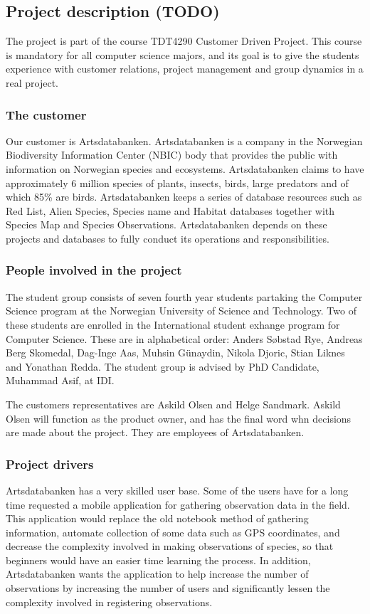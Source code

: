 \subsection{Project description (TODO)}
The project is part of the course TDT4290 Customer Driven Project. This course is mandatory for all computer science majors, and its goal is to give the students experience with customer relations, project management and group dynamics in a real project.

\subsubsection{The customer}
Our customer is Artsdatabanken. Artsdatabanken is a company in the Norwegian Biodiversity Information Center (NBIC) body that provides the public with information on Norwegian species and ecosystems. Artsdatabanken claims to have approximately 6 million species of plants, insects, birds, large predators and of which 85\% are birds. Artsdatabanken keeps a series of database resources such as Red List, Alien Species, Species name and Habitat databases together with Species Map and Species Observations. Artsdatabanken depends on these projects and databases to fully conduct its operations and responsibilities.\cite{artsdatabanken:about} 

\subsubsection{People involved in the project}
The student group consists of seven fourth year students partaking the Computer Science program at the Norwegian University of Science and Technology. Two of these students are enrolled in the International student exhange program for Computer Science. These are in alphabetical order: Anders Søbstad Rye, Andreas Berg Skomedal, Dag-Inge Aas, Muhsin Günaydin, Nikola Djoric, Stian Liknes and Yonathan Redda. The student group is advised by PhD Candidate, Muhammad Asif, at IDI.

The customers representatives are Askild Olsen and Helge Sandmark. Askild Olsen will function as the product owner, and has the final word whn decisions are made about the project. They are employees of Artsdatabanken.

\subsubsection{Project drivers}
Artsdatabanken has a very skilled user base. Some of the users have for a long time requested a mobile application for gathering observation data in the field. This application would replace the old notebook method of gathering information, automate collection of some data such as GPS coordinates, and decrease the complexity involved in making observations of species, so that beginners would have an easier time learning the process. In addition, Artsdatabanken wants the application to help increase the number of observations by increasing the number of users and significantly lessen the complexity involved in registering observations.

